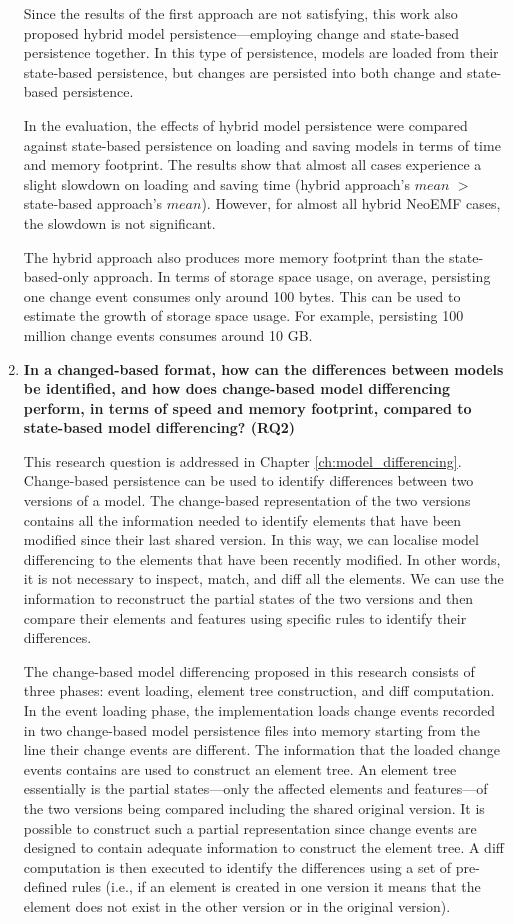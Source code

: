 \begin{enumerate}
  Since the results of the first approach are not satisfying, this work also proposed hybrid model persistence—employing change and state-based persistence together. In this type of persistence, models are loaded from their state-based persistence, but changes are persisted into both change and state-based persistence.
  
  In the evaluation, the effects of hybrid model persistence were compared against state-based persistence on loading and saving models in terms of time and memory footprint. The results show that almost all cases experience a slight slowdown on loading and saving time (hybrid approach’s $mean$ $>$ state-based approach’s $mean$). However, for almost all hybrid NeoEMF cases, the slowdown is not significant.
  
  The hybrid approach also produces more memory footprint than the state-based-only approach. In terms of storage space usage, on average, persisting one change event consumes only around 100 bytes. This can be used to estimate the growth of storage space usage. For example, persisting 100 million change events consumes around 10 GB.
  
  \item \textbf{In a changed-based format, how can the differences between models be identified, and how does change-based model differencing perform, in terms of speed and memory footprint, compared to state-based model differencing? (RQ2)}
  
  This research question is addressed in Chapter \ref{ch:model_differencing}. Change-based persistence can be used to identify differences between two versions of a model. The change-based representation of the two versions contains all the information needed to identify elements that have been modified since their last shared version. In this way, we can localise model differencing to the elements that have been recently modified. In other words, it is not necessary to inspect,  match, and diff all the elements. We can use the information to reconstruct the partial states of the two versions and then compare their elements and features using specific rules to identify their differences.
  
  The change-based model differencing proposed in this research consists of three phases: event loading, element tree construction, and diff computation. In the event loading phase, the implementation loads change events recorded in two change-based model persistence files into memory starting from the line their change events are different. The information that the loaded change events contains are used to construct an element tree. An element tree essentially is the partial states—only the affected elements and features—of the two versions being compared including the shared original version. It is possible to construct such a partial representation since change events are designed to contain adequate information to construct the element tree. A diff computation is then executed to identify the differences using a set of pre-defined rules (i.e., if an element is created in one version it means that the element does not exist in the other version or in the original version).
  

\end{enumerate}
